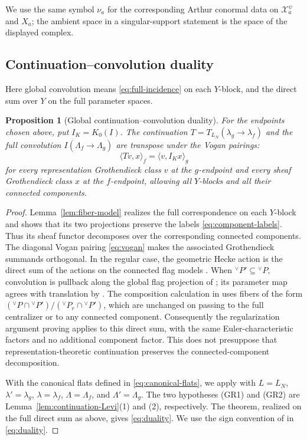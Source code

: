 \documentclass[10pt]{amsart}
\numberwithin{equation}{section}
\theoremstyle{plain}
\newtheorem{proposition}{Proposition}[section]
\theoremstyle{definition}
\theoremstyle{remark}
\newcommand{\vP}{{}^{\vee}P}
\begin{document}
We use the same symbol $\nu_a$ for the corresponding Arthur conormal
data on $\mathcal X_a^\psi$ and $X_a$; the ambient space in a
singular-support statement is the space of the displayed complex.

\subsection{Continuation--convolution duality}

Here global convolution means \eqref{eq:full-incidence} on each
$Y$-block, and the direct sum over $Y$ on the full parameter spaces.

\begin{proposition}[Global continuation--convolution duality]
\label{prop:global-duality}
For the endpoints chosen above, put $I_K=K_0(I)$. The continuation
$T=T_{L_N}(\lambda_g\to\lambda_f)$ and the full convolution
$I(\Lambda_f\to\Lambda_g)$ are transpose under the Vogan pairings:
\begin{equation}\label{eq:duality}
 \langle Tv,x\rangle_f
 =
 \langle v,I_Kx\rangle_g
\end{equation}
for every representation Grothendieck class $v$ at the $g$-endpoint
and every sheaf Grothendieck class $x$ at the $f$-endpoint, allowing
all $Y$-blocks and all their connected components.
\end{proposition}

\begin{proof}
Lemma~\ref{lem:fiber-model} realizes the full correspondence on each
$Y$-block and shows that its two projections preserve the labels
\eqref{eq:component-labels}. Thus its sheaf functor decomposes over
the corresponding connected components. The diagonal Vogan pairing
\eqref{eq:vogan} makes the associated Grothendieck summands orthogonal.
In the regular case, the geometric Hecke action is the direct sum of
the actions on the connected flag models
\cite[(8.9), Propositions~16.13 and~17.16]{ABV92}.
When $\vP'\subseteq\vP$, convolution is pullback along the global
flag projection of \cite[Proposition~8.8]{ABV92}; its parameter map
agrees with translation by \cite[Proposition~16.6]{ABV92}.
The composition calculation in \cite[Lemma~3.5.3]{AIMV26} uses fibers
of the form $(\vP\cap\vP')/(\vP_r\cap\vP')$, which are unchanged
on passing to the full centralizer or to any connected component.
Consequently the regularization argument proving
\cite[Theorem~3.6.3]{AIMV26} applies to this direct sum, with the
same Euler-characteristic factors and no additional component factor.
This does not presuppose that representation-theoretic continuation
preserves the connected-component decomposition.

With the canonical flats defined in
\eqref{eq:canonical-flats}, we apply
\cite[Theorem~3.6.3]{AIMV26} with $L=L_N$, $\lambda'=\lambda_g$,
$\lambda=\lambda_f$, $\Lambda=\Lambda_f$, and $\Lambda'=\Lambda_g$.
The two hypotheses \textup{(GR1)} and \textup{(GR2)} are
Lemma~\ref{lem:continuation-Levi}(1) and (2), respectively. The theorem,
realized on the full direct sum as above, gives \eqref{eq:duality}.
We use the sign convention of \cite[Theorem~3.6.3]{AIMV26} in
\eqref{eq:duality}.
\end{proof}
\end{document}
